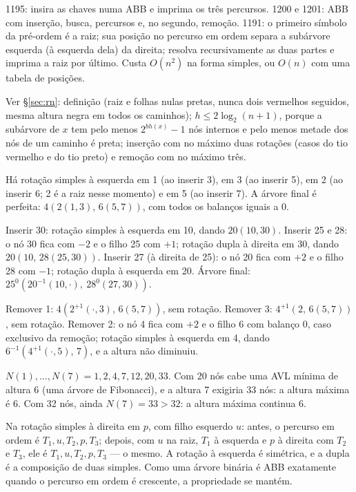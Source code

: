  1195: insira as chaves numa ABB e imprima os três percursos. 1200 e 1201: ABB com inserção, busca, percursos e, no segundo, remoção. 1191: o primeiro símbolo da pré-ordem é a raiz; sua posição no percurso em ordem separa a subárvore esquerda (à esquerda dela) da direita; resolva recursivamente as duas partes e imprima a raiz por último. Custa $O(n^2)$ na forma simples, ou $O(n)$ com uma tabela de posições.

 Ver §\ref{sec:rn}: definição (raiz e folhas nulas pretas, nunca dois vermelhos seguidos, mesma altura negra em todos os caminhos); $h\le2\log_2(n+1)$, porque a subárvore de $x$ tem pelo menos $2^{bh(x)}-1$ nós internos e pelo menos metade dos nós de um caminho é preta; inserção com no máximo duas rotações (casos do tio vermelho e do tio preto) e remoção com no máximo três.

 Há rotação simples à esquerda em 1 (ao inserir 3), em 3 (ao inserir 5), em 2 (ao inserir 6; 2 é a raiz nesse momento) e em 5 (ao inserir 7). A árvore final é perfeita: $4(2(1,3),\,6(5,7))$, com todos os balanços iguais a 0.

 Inserir 30: rotação simples à esquerda em 10, dando $20(10,30)$. Inserir 25 e 28: o nó 30 fica com $-2$ e o filho 25 com $+1$; rotação dupla à direita em 30, dando $20(10,\,28(25,30))$. Inserir 27 (à direita de 25): o nó 20 fica com $+2$ e o filho 28 com $-1$; rotação dupla à esquerda em 20. Árvore final: $25^{0}(20^{-1}(10,\cdot),\ 28^{0}(27,30))$.

 Remover 1: $4(2^{+1}(\cdot,3),\,6(5,7))$, sem rotação. Remover 3: $4^{+1}(2,\,6(5,7))$, sem rotação. Remover 2: o nó 4 fica com $+2$ e o filho 6 com balanço 0, caso exclusivo da remoção; rotação simples à esquerda em 4, dando $6^{-1}(4^{+1}(\cdot,5),\,7)$, e a altura não diminuiu.

 $N(1),\dots,N(7)=1,2,4,7,12,20,33$. Com 20 nós cabe uma AVL mínima de altura 6 (uma árvore de Fibonacci), e a altura 7 exigiria 33 nós: a altura máxima é 6. Com 32 nós, ainda $N(7)=33>32$: a altura máxima continua 6.

 Na rotação simples à direita em $p$, com filho esquerdo $u$: antes, o percurso em ordem é $T_1,u,T_2,p,T_3$; depois, com $u$ na raiz, $T_1$ à esquerda e $p$ à direita com $T_2$ e $T_3$, ele é $T_1,u,T_2,p,T_3$ --- o mesmo. A rotação à esquerda é simétrica, e a dupla é a composição de duas simples. Como uma árvore binária é ABB exatamente quando o percurso em ordem é crescente, a propriedade se mantém.

